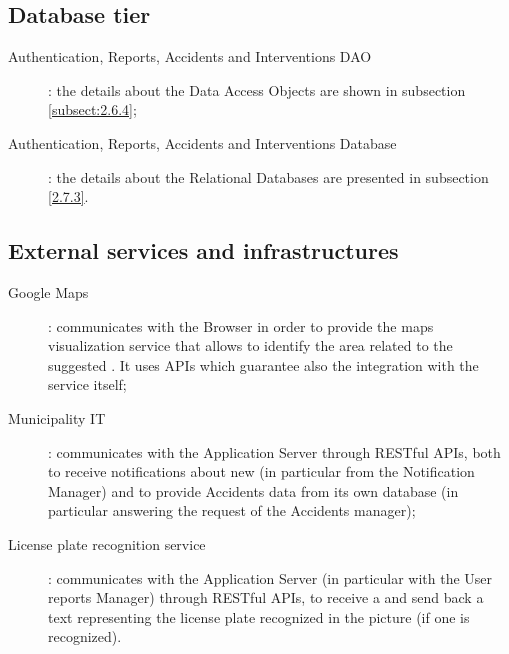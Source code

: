 \documentclass[../../DD.tex]{subfiles}
\begin{document}
\subsection{Database tier\label{sect:2.2.4}}
	\begin{description}
	\item[Authentication, Reports, Accidents and Interventions DAO]: the details about the Data Access Objects are shown in subsection \ref{subsect:2.6.4};
	
	\item[Authentication, Reports, Accidents and Interventions Database]: the details about the Relational Databases are presented in subsection \ref{2.7.3}.
	\end{description}
	
\subsection{External services and infrastructures\label{sect:2.2.5}}
	\begin{description}
	\item[Google Maps]: communicates with the Browser in order to provide the maps visualization service that allows to identify the area related to the suggested . It uses APIs which guarantee also the integration with the service itself;
	
	\item[Municipality IT]: communicates with the Application Server through RESTful APIs, both to receive notifications about new  (in particular from the Notification Manager) and to provide Accidents data from its own database (in particular answering the request of the Accidents manager);
	
	\item[License plate recognition service]: communicates with the Application Server (in particular with the User reports Manager) through RESTful APIs, to receive a  and send back a text representing the license plate recognized in the picture (if one is recognized). 
	\end{description}

\newpage
\end{document}

